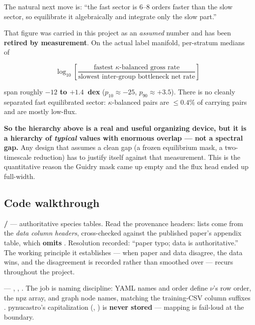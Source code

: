 The natural next move is: ``the fast sector is 6--8 orders faster than the slow
sector, so equilibrate it algebraically and integrate only the slow part.''

That figure was carried in this project as an \emph{assumed} number and has been
\textbf{retired by measurement}. On the actual label manifold, per-stratum
medians of

\begin{equation*}
\log_{10}\left[\frac{\text{fastest } \kappa\text{-balanced gross rate}}
                    {\text{slowest inter-group bottleneck net rate}}\right]
\end{equation*}

span roughly \textbf{$-12$ to $+1.4$~dex} ($p_{10} \approx -25$,
$p_{90} \approx +3.5$). There is no cleanly separated fast equilibrated sector:
$\kappa$-balanced pairs are $\le 0.4\%$ of carrying pairs and are mostly
low-flux.

\begin{aside}
\textbf{So the hierarchy above is a real and useful organizing device, but it is
a hierarchy of \emph{typical} values with enormous overlap --- not a spectral
gap.} Any design that assumes a clean gap (a frozen equilibrium mask, a
two-timescale reduction) has to justify itself against that measurement. This is
the quantitative reason the Guidry mask came up empty and the flux head ended up
full-width.
\end{aside}

\subsection{Code walkthrough}
\label{sec:codewalkthrough-s0}

\textbf{ / }
--- authoritative species tables. Read the provenance headers: lists come from
the \emph{data column headers}, cross-checked against the published paper's
appendix table, which \textbf{omits }. Resolution recorded: ``paper
typo; data is authoritative.'' The working principle it establishes --- when
paper and data disagree, the data wins, and the disagreement is recorded rather
than smoothed over --- recurs throughout the project.

\textbf{} --- ,
, . The job is naming
discipline: YAML names and order define $\nu$'s row order, the npz
 array, and graph node names, matching the training-CSV column
suffixes . pynucastro's capitalization (,
) is \textbf{never stored} --- mapping is fail-loud at the boundary.

